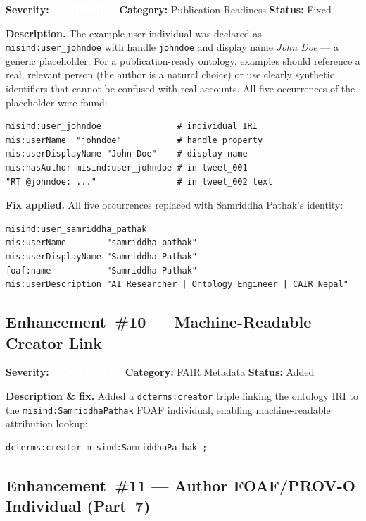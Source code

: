 \documentclass[11pt, a4paper]{article}
\newcommand{\badgeMinor}{\textcolor{white}{\colorbox{severity-minor}{\footnotesize\textbf{\ \ MINOR\ \ }}}}
\newcommand{\badgeEnhancement}{\textcolor{white}{\colorbox{cair-mid}{\footnotesize\textbf{\ ENHANCE\ }}}}
\newcommand{\ind}[1]{\texttt{misind:#1}}
\begin{document}
\textbf{Severity:} \badgeMinor\quad
\textbf{Category:} Publication Readiness\quad
\textbf{Status:} Fixed

\textbf{Description.}
The example user individual was declared as \ind{user\_johndoe} with
handle \texttt{johndoe} and display name \emph{John Doe} — a generic
placeholder. For a publication-ready ontology, examples should reference
a real, relevant person (the author is a natural choice) or use clearly
synthetic identifiers that cannot be confused with real accounts.
All five occurrences of the placeholder were found:

\begin{lstlisting}
misind:user_johndoe               # individual IRI
mis:userName  "johndoe"           # handle property
mis:userDisplayName "John Doe"    # display name
mis:hasAuthor misind:user_johndoe # in tweet_001
"RT @johndoe: ..."                # in tweet_002 text
\end{lstlisting}

\textbf{Fix applied.} All five occurrences replaced with Samriddha Pathak's identity:
\begin{lstlisting}
misind:user_samriddha_pathak
mis:userName        "samriddha_pathak"
mis:userDisplayName "Samriddha Pathak"
foaf:name           "Samriddha Pathak"
mis:userDescription "AI Researcher | Ontology Engineer | CAIR Nepal"
\end{lstlisting}

\subsection{Enhancement~\#10 --- Machine-Readable Creator Link}
\label{enh:10}

\textbf{Severity:} \badgeEnhancement\quad
\textbf{Category:} FAIR Metadata\quad
\textbf{Status:} Added

\textbf{Description \& fix.}
Added a \texttt{dcterms:creator} triple linking the ontology IRI to the
\ind{SamriddhaPathak} FOAF individual, enabling machine-readable
attribution lookup:
\begin{lstlisting}
dcterms:creator misind:SamriddhaPathak ;
\end{lstlisting}

\subsection{Enhancement~\#11 --- Author FOAF/PROV-O Individual (Part~7)}
\label{enh:11}
\end{document}
